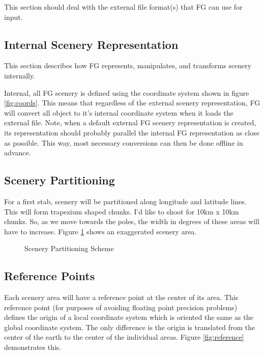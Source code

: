 \documentclass[12pt]{article}
\begin{document}
This section should deal with the external file format(s) that FG can
use for input.

\subsection{Internal Scenery Representation}

This section describes how FG represents, manipulates, and
transforms scenery internally.

Internal, all FG scenery is defined using the coordinate system shown
in figure \ref{fig:coords}.  This means that regardless of the
external scenery representation, FG will convert all object to it's
internal coordinate system when it loads the external file.  Note,
when a default external FG scenery representation is created, its
representation should probably parallel the internal FG representation
as close as possible.  This way, most necessary conversions can then
be done offline in advance.

\subsection{Scenery Partitioning}

For a first stab, scenery will be partitioned along longitude and
latitude lines.  This will form trapezium shaped chunks.  I'd like to
shoot for 10km x 10km chunks.  So, as we move towards the poles, the
width in degrees of these areas will have to increase.  Figure
\ref{fig:trap} shows an exaggerated scenery area.

\begin{figure}[hbt]
  \centerline{                   
  }
  \caption{Scenery Partitioning Scheme}
  \label{fig:trap}
\end{figure}

\subsection{Reference Points}

Each scenery area will have a reference point at the center of its
area.  This reference point (for purposes of avoiding floating point
precision problems) defines the origin of a local coordinate system
which is oriented the same as the global coordinate system.  The only
difference is the origin is translated from the center of the earth to
the center of the individual areas.  Figure \ref{fig:reference}
demonstrates this.
\end{document}
